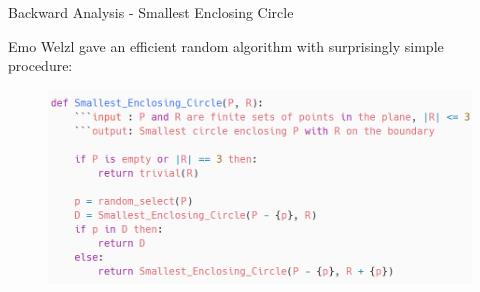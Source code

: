 \documentclass{beamer}
\newcommand{\lf}{\left[}
\newcommand{\rf}{\right]}
\begin{document}
\begin{frame}{Backward Analysis - Smallest Enclosing Circle}

	Emo Welzl gave an efficient random algorithm with surprisingly simple procedure:

	\begin{figure}[h]
		\includegraphics[width=1.0\linewidth]{pics/smallest_enclosing_circle_psudocode.png}
	\end{figure}







\end{frame}
\end{document}
